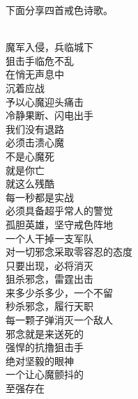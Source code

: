 下面分享四首戒色诗歌。

\begin{poem}[抗撸狙击手]
    \begin{multicols}{2}
        \begin{center}~\\
            魔军入侵，兵临城下 \\ 狙击手临危不乱 \\ 在悄无声息中 \\ 沉着应战 \\ 予以心魔迎头痛击 \\ 冷静果断、闪电出手 \\ 我们没有退路 \\ 必须击溃心魔 \\ 不是心魔死 \\ 就是你亡 \\ 就这么残酷 \\ 每一秒都是实战 \\ 必须具备超乎常人的警觉 \\ 孤胆英雄，坚守戒色阵地 \\ 一个人干掉一支军队 \\ 对一切邪念采取零容忍的态度 \\ 只要出现，必将消灭 \\ 狙杀邪念，雷霆出击 \\ 来多少杀多少，一个不留 \\ 秒杀邪念，履行天职 \\ 每一颗子弹消灭一个敌人 \\ 邪念就是来送死的 \\ 强悍的抗撸狙击手 \\ 绝对坚毅的眼神 \\ 一个让心魔颤抖的 \\ 至强存在
        \end{center}
    \end{multicols}
\end{poem}

